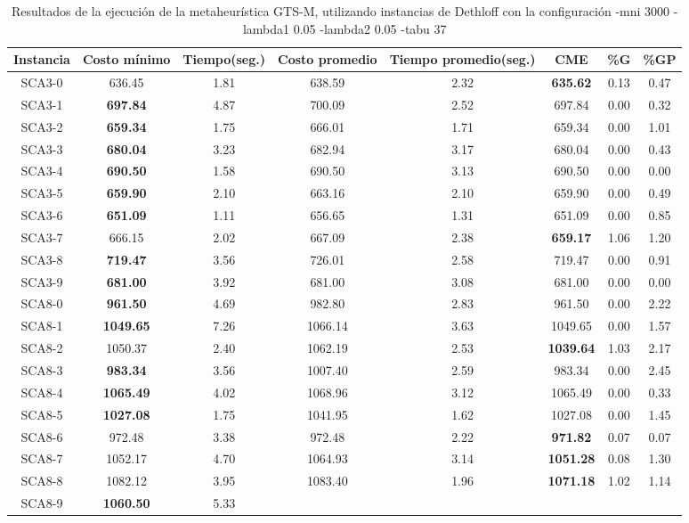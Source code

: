 \begin{table}[h]
\caption{Resultados de la ejecución de la metaheurística GTS-M, utilizando instancias de Dethloff con la configuración -mni 3000 -lambda1 0.05 -lambda2 0.05 -tabu 37}
\centering
\small
\begin{tabular}{c c c c c c c c}
\hline\hline
Instancia & Costo mínimo & Tiempo(seg.) & Costo promedio & Tiempo promedio(seg.) & CME & \%G & \%GP \\ [0.5ex]
\hline
SCA3-0 & 636.45 & 1.81 & 
638.59 & 2.32 & \bf{635.62} & 
0.13 & 0.47\\SCA3-1 & \bf{697.84} & 4.87 & 
700.09 & 2.52 & 697.84 & 0.00
 & 0.32\\SCA3-2 & \bf{659.34} & 1.75 & 
666.01 & 1.71 & 659.34 & 0.00
 & 1.01\\SCA3-3 & \bf{680.04} & 3.23 & 
682.94 & 3.17 & 680.04 & 0.00
 & 0.43\\SCA3-4 & \bf{690.50} & 1.58 & 
690.50 & 3.13 & 690.50 & 0.00
 & 0.00\\
SCA3-5 & \bf{659.90} & 2.10 & 
663.16 & 2.10 & 659.90 & 0.00
 & 0.49\\SCA3-6 & \bf{651.09} & 1.11 & 
656.65 & 1.31 & 651.09 & 0.00
 & 0.85\\SCA3-7 & 666.15 & 2.02 & 
667.09 & 2.38 & \bf{659.17} & 
1.06 & 1.20\\SCA3-8 & \bf{719.47} & 3.56 & 
726.01 & 2.58 & 719.47 & 0.00
 & 0.91\\SCA3-9 & \bf{681.00} & 3.92 & 
681.00 & 3.08 & 681.00 & 0.00
 & 0.00\\
SCA8-0 & \bf{961.50} & 4.69 & 
982.80 & 2.83 & 961.50 & 0.00
 & 2.22\\SCA8-1 & \bf{1049.65} & 7.26 & 
1066.14 & 3.63 & 1049.65 & 0.00
 & 1.57\\SCA8-2 & 1050.37 & 2.40 & 
1062.19 & 2.53 & \bf{1039.64} & 
1.03 & 2.17\\SCA8-3 & \bf{983.34} & 3.56 & 
1007.40 & 2.59 & 983.34 & 0.00
 & 2.45\\SCA8-4 & \bf{1065.49} & 4.02 & 
1068.96 & 3.12 & 1065.49 & 0.00
 & 0.33\\SCA8-5 & \bf{1027.08} & 1.75 & 
1041.95 & 1.62 & 1027.08 & 0.00
 & 1.45\\SCA8-6 & 972.48 & 3.38 & 
972.48 & 2.22 & \bf{971.82} & 
0.07 & 0.07\\SCA8-7 & 1052.17 & 4.70 & 
1064.93 & 3.14 & \bf{1051.28} & 
0.08 & 1.30\\SCA8-8 & 1082.12 & 3.95 & 
1083.40 & 1.96 & \bf{1071.18} & 
1.02 & 1.14\\SCA8-9 & \bf{1060.50} & 5.33 & 

\end{tabular}
\end{table}
